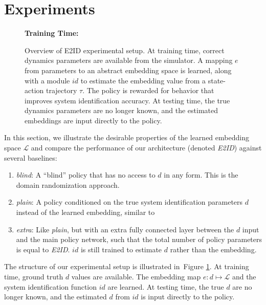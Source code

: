 \documentclass{article}
\newcommand{\TODO}[1]{\textcolor{red}{\textbf{TODO: #1}}}
\newcommand{\cL}{\mathcal{L}}
\newcommand{\cS}{\mathcal{S}}
\newcommand{\blind}{\emph{blind}}
\newcommand{\plain}{\emph{plain}}
\newcommand{\extra}{\emph{extra}}
\newcommand{\embed}{\emph{E2ID}}
\newcommand{\traj}{\emph{traj}}
\newcommand{\embedfn}{e}
\newcommand{\idfn}{id}
\newcommand{\latent}{\cL}
\newcommand{\idvar}{d}
\newcommand{\figref}[1]{Figure \ref{#1}}
\begin{document}
\section{Experiments}

\begin{figure}[ht]
\centering
\textbf{Training Time:}

\vspace{0.4cm}

\vspace{0.4cm}
\caption{
Overview of E2ID experimental setup.
At training time, correct dynamics parameters are available from the simulator.
A mapping $\embedfn$ from parameters to an abstract embedding space is learned,
along with a module $\idfn$ to estimate the embedding value from a state-action trajectory $\tau$.
The policy is rewarded for behavior that improves system identification accuracy.
At testing time, the true dynamics parameters are no longer known,
and the estimated embeddings are input directly to the policy.
}
\label{fig:overview}
\end{figure}

In this section, we illustrate the desirable properties of the learned embedding space $\latent$
and compare the performance of our architecture (denoted \embed) against several baselines:
\begin{enumerate}
\item \blind{}: A ``blind'' policy that has no access to $\idvar$ in any form. This is the domain randomization approach.
\item \plain{}: A policy conditioned on the true system identification parameters $\idvar$ instead of the learned embedding, similar to~\citet{yu-up-osi-rss17}
\item \extra{}: Like \plain{}, but with an extra fully connected layer between the $\idvar$ input and the main policy network, such that the total number of policy parameters is equal to \embed.  $\idfn$ is still trained to estimate $\idvar$ rather than the embedding.
\end{enumerate}
The structure of our experimental setup is illustrated in~\figref{fig:overview}.
At training time, ground truth $\idvar$ values are available.
The embedding map $\embedfn : \idvar \mapsto \latent$ 
and the system identification function $\idfn$ are learned.
At testing time, the true $\idvar$ are no longer known,
and the estimated $\idvar$ from $\idfn$ is input directly to the policy.
\end{document}
